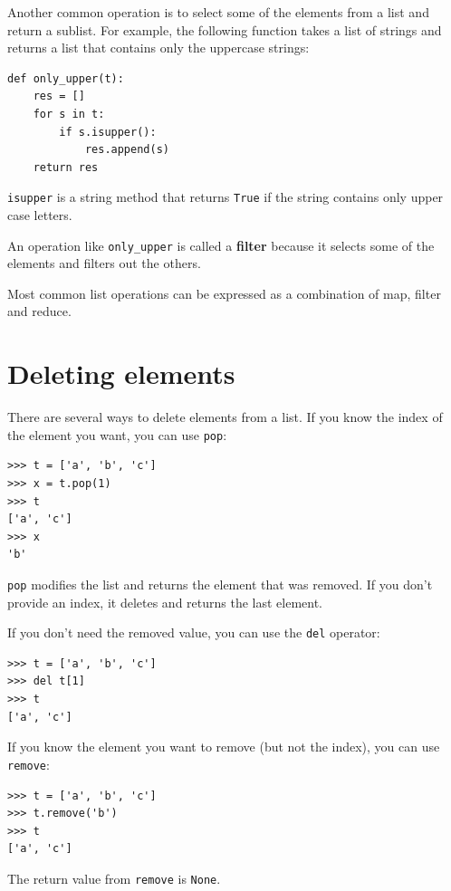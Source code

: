 \documentclass[10pt]{book}
\begin{document}
Another common operation is to select some of the elements from
a list and return a sublist.  For example, the following
function takes a list of strings and returns a list that contains
only the uppercase strings:

\begin{verbatim}
def only_upper(t):
    res = []
    for s in t:
        if s.isupper():
            res.append(s)
    return res
\end{verbatim}
%
{\tt isupper} is a string method that returns {\tt True} if
the string contains only upper case letters.

An operation like \verb"only_upper" is called a {\bf filter} because
it selects some of the elements and filters out the others.

Most common list operations can be expressed as a combination
of map, filter and reduce.


\section{Deleting elements}

There are several ways to delete elements from a list.  If you
know the index of the element you want, you can use
{\tt pop}:

\begin{verbatim}
>>> t = ['a', 'b', 'c']
>>> x = t.pop(1)
>>> t
['a', 'c']
>>> x
'b'
\end{verbatim}
%
{\tt pop} modifies the list and returns the element that was removed.
If you don't provide an index, it deletes and returns the
last element.

If you don't need the removed value, you can use the {\tt del}
operator:

\begin{verbatim}
>>> t = ['a', 'b', 'c']
>>> del t[1]
>>> t
['a', 'c']
\end{verbatim}
%
If you know the element you want to remove (but not the index), you
can use {\tt remove}:

\begin{verbatim}
>>> t = ['a', 'b', 'c']
>>> t.remove('b')
>>> t
['a', 'c']
\end{verbatim}
%
The return value from {\tt remove} is {\tt None}.
\end{document}
